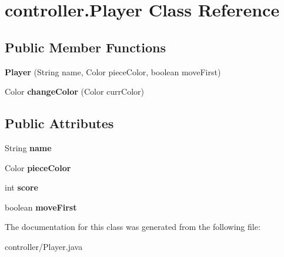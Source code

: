 \hypertarget{classcontroller_1_1Player}{\section{controller.\-Player Class Reference}
\label{classcontroller_1_1Player}
}
\subsection*{Public Member Functions}
\begin{DoxyCompactItemize}
\item 
\hypertarget{classcontroller_1_1Player_a58bbebdd3aa47ede2185c45224678993}{{\bfseries Player} (String name, Color piece\-Color, boolean move\-First)}\label{classcontroller_1_1Player_a58bbebdd3aa47ede2185c45224678993}

\item 
\hypertarget{classcontroller_1_1Player_a78ec50c3386297a1259b708256f84cdc}{Color {\bfseries change\-Color} (Color curr\-Color)}\label{classcontroller_1_1Player_a78ec50c3386297a1259b708256f84cdc}

\end{DoxyCompactItemize}
\subsection*{Public Attributes}
\begin{DoxyCompactItemize}
\item 
\hypertarget{classcontroller_1_1Player_a2ad925eb3b21c1775d67a9a2d37b1f5d}{String {\bfseries name}}\label{classcontroller_1_1Player_a2ad925eb3b21c1775d67a9a2d37b1f5d}

\item 
\hypertarget{classcontroller_1_1Player_a239bc3aadcce4cb775af2a7add5b23db}{Color {\bfseries piece\-Color}}\label{classcontroller_1_1Player_a239bc3aadcce4cb775af2a7add5b23db}

\item 
\hypertarget{classcontroller_1_1Player_a52e9c6b60ae75a34e37757e212419d89}{int {\bfseries score}}\label{classcontroller_1_1Player_a52e9c6b60ae75a34e37757e212419d89}

\item 
\hypertarget{classcontroller_1_1Player_a1f90db3dc9aeb4f8861177b5546459f5}{boolean {\bfseries move\-First}}\label{classcontroller_1_1Player_a1f90db3dc9aeb4f8861177b5546459f5}

\end{DoxyCompactItemize}


The documentation for this class was generated from the following file\-:\begin{DoxyCompactItemize}
\item 
controller/Player.\-java\end{DoxyCompactItemize}
